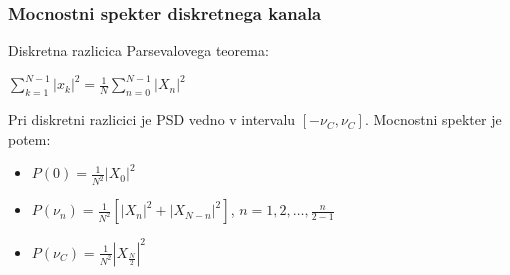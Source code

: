 \documentclass{article}
\begin{document}
\begin{multicols}{4}
	\subsubsection{Mocnostni spekter diskretnega kanala}
	Diskretna razlicica Parsevalovega teorema:
	\begin{center}
		\begin{math}
			\sum_{k=1}^{N-1} |x_k|^2 = \frac{1}{N} \sum_{n=0}^{N-1} |X_n|^2
		\end{math}
	\end{center}
	Pri diskretni razlicici je PSD vedno v intervalu $[- \nu_C, \nu_C]$.
	Mocnostni spekter je potem:
	\begin{itemize}
		\item $P(0) = \frac{1}{N^2} |X_0|^2$
		\item $P(\nu_n) = \frac{1}{N^2} [|X_n|^2 + |X_{N-n}|^2]$, $n = 1, 2, \dots, \frac{n}{2-1}$
		\item $P(\nu_C) = \frac{1}{N^2}|X_{\frac{N}{2}}|^2$
	\end{itemize}

\end{multicols}
\end{document}
